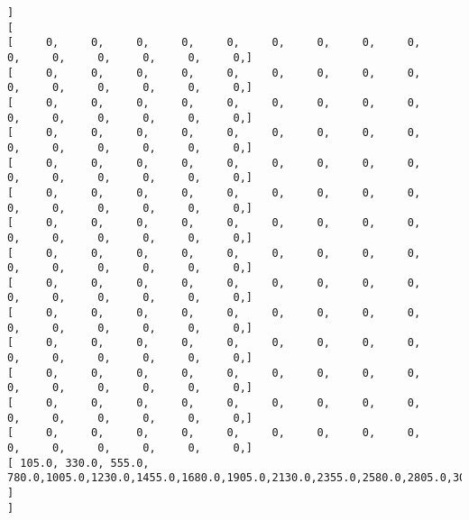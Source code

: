 \documentclass[11pt]{article}
\begin{document}
\begin{Verbatim}[commandchars=\\\{\}]
]
[
[      0,      0,      0,      0,      0,      0,      0,      0,      0,      0,      0,      0,      0,      0,      0, ]
[      0,      0,      0,      0,      0,      0,      0,      0,      0,      0,      0,      0,      0,      0,      0, ]
[      0,      0,      0,      0,      0,      0,      0,      0,      0,      0,      0,      0,      0,      0,      0, ]
[      0,      0,      0,      0,      0,      0,      0,      0,      0,      0,      0,      0,      0,      0,      0, ]
[      0,      0,      0,      0,      0,      0,      0,      0,      0,      0,      0,      0,      0,      0,      0, ]
[      0,      0,      0,      0,      0,      0,      0,      0,      0,      0,      0,      0,      0,      0,      0, ]
[      0,      0,      0,      0,      0,      0,      0,      0,      0,      0,      0,      0,      0,      0,      0, ]
[      0,      0,      0,      0,      0,      0,      0,      0,      0,      0,      0,      0,      0,      0,      0, ]
[      0,      0,      0,      0,      0,      0,      0,      0,      0,      0,      0,      0,      0,      0,      0, ]
[      0,      0,      0,      0,      0,      0,      0,      0,      0,      0,      0,      0,      0,      0,      0, ]
[      0,      0,      0,      0,      0,      0,      0,      0,      0,      0,      0,      0,      0,      0,      0, ]
[      0,      0,      0,      0,      0,      0,      0,      0,      0,      0,      0,      0,      0,      0,      0, ]
[      0,      0,      0,      0,      0,      0,      0,      0,      0,      0,      0,      0,      0,      0,      0, ]
[      0,      0,      0,      0,      0,      0,      0,      0,      0,      0,      0,      0,      0,      0,      0, ]
[  105.0,  330.0,  555.0,  780.0, 1005.0, 1230.0, 1455.0, 1680.0, 1905.0, 2130.0, 2355.0, 2580.0, 2805.0, 3030.0, 3255.0, ]
]
]

    \end{Verbatim}


    
    
    
    
\end{document}
